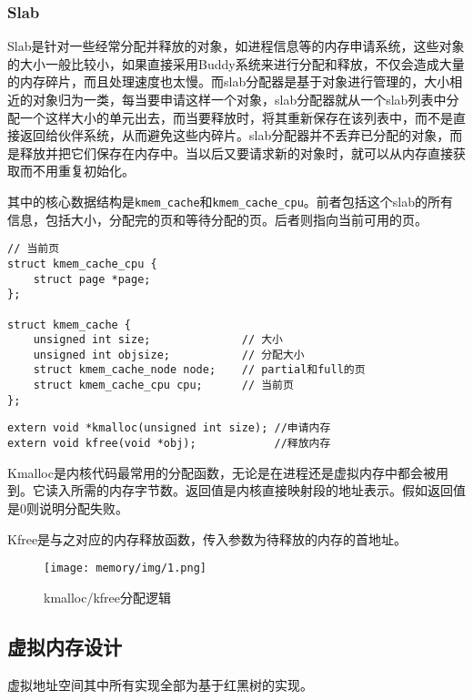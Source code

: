 \subsubsection{Slab}

Slab是针对一些经常分配并释放的对象，如进程信息等的内存申请系统，这些对象的大小一般比较小，如果直接采用Buddy系统来进行分配和释放，不仅会造成大量的内存碎片，而且处理速度也太慢。而slab分配器是基于对象进行管理的，大小相近的对象归为一类，每当要申请这样一个对象，slab分配器就从一个slab列表中分配一个这样大小的单元出去，而当要释放时，将其重新保存在该列表中，而不是直接返回给伙伴系统，从而避免这些内碎片。slab分配器并不丢弃已分配的对象，而是释放并把它们保存在内存中。当以后又要请求新的对象时，就可以从内存直接获取而不用重复初始化。

其中的核心数据结构是\texttt{kmem\_cache}和\texttt{kmem\_cache\_cpu}。前者包括这个slab的所有信息，包括大小，分配完的页和等待分配的页。后者则指向当前可用的页。


\begin{lstlisting}[caption=Slab系统核心结构]
// 当前页
struct kmem_cache_cpu {
    struct page *page;
};

struct kmem_cache {
    unsigned int size;              // 大小
    unsigned int objsize;           // 分配大小
    struct kmem_cache_node node;    // partial和full的页
    struct kmem_cache_cpu cpu;      // 当前页
};
\end{lstlisting}


\begin{lstlisting}[caption=对外接口]
extern void *kmalloc(unsigned int size); //申请内存
extern void kfree(void *obj);            //释放内存
\end{lstlisting}

Kmalloc是内核代码最常用的分配函数，无论是在进程还是虚拟内存中都会被用到。它读入所需的内存字节数。返回值是内核直接映射段的地址表示。假如返回值是0则说明分配失败。

Kfree是与之对应的内存释放函数，传入参数为待释放的内存的首地址。

\begin{figure}[H]
  \centering
  \texttt{[image: memory/img/1.png]}
  \caption{kmalloc/kfree分配逻辑}
\end{figure}


\subsection{虚拟内存设计}

虚拟地址空间其中所有实现全部为基于红黑树的实现。

